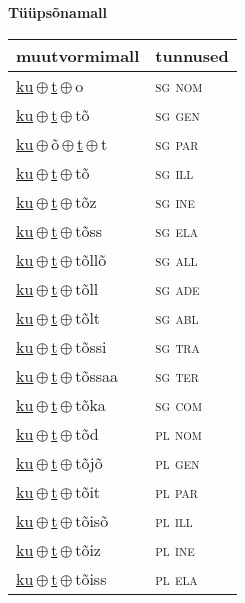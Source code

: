 

\vspace{3.5em}
\noindent \begin{minipage}{\textwidth}
\noindent \textbf{Tüüpsõnamall \,}\\

\begin{sideways}
\begin{tabular}{l l}
muutvormimall & tunnused \\
\hline
\underline{ku}\,$\oplus$\,\underline{t}\,$\oplus$\,o & \textsc{ sg nom } \\
\underline{ku}\,$\oplus$\,\underline{t}\,$\oplus$\,tõ & \textsc{ sg gen } \\
\underline{ku}\,$\oplus$\,õ\,$\oplus$\,\underline{t}\,$\oplus$\,t & \textsc{ sg par } \\
\underline{ku}\,$\oplus$\,\underline{t}\,$\oplus$\,tõ & \textsc{ sg ill } \\
\underline{ku}\,$\oplus$\,\underline{t}\,$\oplus$\,tõz & \textsc{ sg ine } \\
\underline{ku}\,$\oplus$\,\underline{t}\,$\oplus$\,tõss & \textsc{ sg ela } \\
\underline{ku}\,$\oplus$\,\underline{t}\,$\oplus$\,tõllõ & \textsc{ sg all } \\
\underline{ku}\,$\oplus$\,\underline{t}\,$\oplus$\,tõll & \textsc{ sg ade } \\
\underline{ku}\,$\oplus$\,\underline{t}\,$\oplus$\,tõlt & \textsc{ sg abl } \\
\underline{ku}\,$\oplus$\,\underline{t}\,$\oplus$\,tõssi & \textsc{ sg tra } \\
\underline{ku}\,$\oplus$\,\underline{t}\,$\oplus$\,tõssaa & \textsc{ sg ter } \\
\underline{ku}\,$\oplus$\,\underline{t}\,$\oplus$\,tõka & \textsc{ sg com } \\
\underline{ku}\,$\oplus$\,\underline{t}\,$\oplus$\,tõd & \textsc{ pl nom } \\
\underline{ku}\,$\oplus$\,\underline{t}\,$\oplus$\,tõjõ & \textsc{ pl gen } \\
\underline{ku}\,$\oplus$\,\underline{t}\,$\oplus$\,tõit & \textsc{ pl par } \\
\underline{ku}\,$\oplus$\,\underline{t}\,$\oplus$\,tõisõ & \textsc{ pl ill } \\
\underline{ku}\,$\oplus$\,\underline{t}\,$\oplus$\,tõiz & \textsc{ pl ine } \\
\underline{ku}\,$\oplus$\,\underline{t}\,$\oplus$\,tõiss & \textsc{ pl ela } \\

\end{tabular}
\end{sideways}
\end{minipage}
